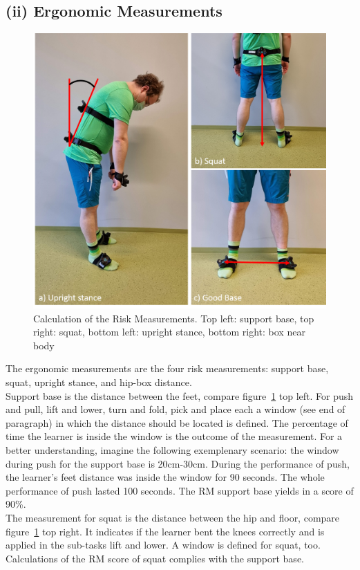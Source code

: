 \subsection{(ii) Ergonomic Measurements}
\begin{figure}[H]
	\centering
	\includegraphics[width=\textwidth]{figures/riskMeasurements.png}
	\caption[Risk Measurement calculation.]{Calculation of the Risk Measurements. Top left: support base, top right: squat, bottom left: upright stance, bottom right: box near body}
	\label{fig:rmCalc}
\end{figure}
The ergonomic measurements are the four risk measurements: support base, squat, upright stance, and hip-box distance.\\
Support base is the distance between the feet, compare figure~\ref{fig:rmCalc} top left. For push and pull, lift and lower, turn and fold, pick and place each a window (see end of paragraph) in which the distance should be located is defined. The percentage of time the learner is inside the window is the outcome of the measurement. For a better understanding, imagine the following exemplenary  scenario: the window during push for the support base is 20cm-30cm. During the performance of push, the learner's feet distance was inside the window for 90 seconds. The whole performance of push lasted 100 seconds. The RM support base yields in a score of 90\%.\\
The measurement for squat is the distance between the hip and floor, compare figure~\ref{fig:rmCalc} top right. It indicates if the learner bent the knees correctly and is applied in the sub-tasks lift and lower. A window is defined for squat, too. Calculations of the RM score of squat complies with the support base.\\
